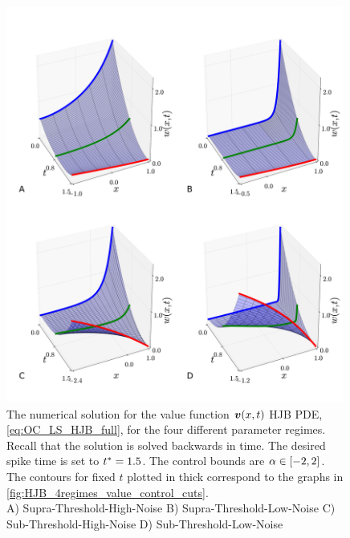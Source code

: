 \documentclass{article}
\begin{document}
\begin{figure}[h!]  
\begin{center}
\includegraphics[width=0.99\textwidth]{Figs/HJB/Regimes_valuesurf.pdf}
\caption{The numerical solution for the value function ${ \boldsymbol{v} }(x,t)$ HJB PDE,
\cref{eq:OC_LS_HJB_full}, for the four different parameter regimes. Recall that
the solution is solved backwards in time.
The desired spike time is set to ${ t^* }=1.5$.  
The control bounds are ${\alpha} \in [-2,2]$. 
The contours for fixed $t$ plotted in thick correspond to the graphs in \cref{fig:HJB_4regimes_value_control_cuts}.
\\   
A) Supra-Threshold-High-Noise B) Supra-Threshold-Low-Noise 
C) Sub-Threshold-High-Noise   D) Sub-Threshold-Low-Noise  }
\label{fig:HJB_4regimes_value_surf}
\end{center} 
\end{figure}  
\end{document}
